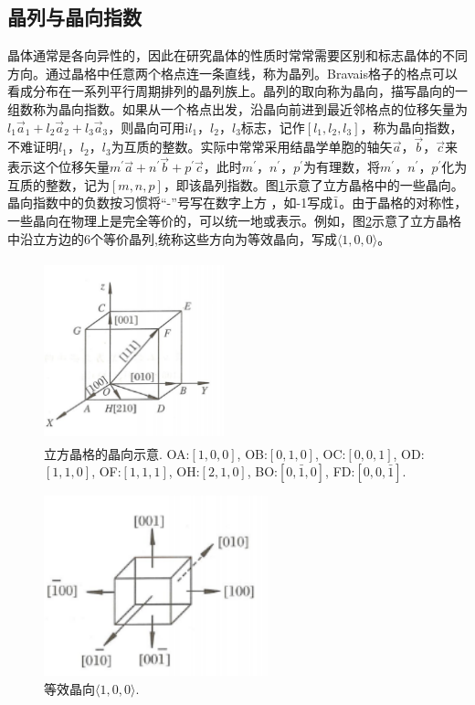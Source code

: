 \subsection{晶列与晶向指数} 
晶体通常是各向异性的，因此在研究晶体的性质时常常需要区别和标志晶体的不同方向。通过晶格中任意两个格点连一条直线，称为晶列。Bravais格子的格点可以看成分布在一系列平行周期排列的晶列族上。晶列的取向称为晶向，描写晶向的一组数称为晶向指数。如果从一个格点出发，沿晶向前进到最近邻格点的位移矢量为$l_1\vec a_1+l_2\vec a_2+l_3\vec a_3$，则晶向可用i$l_1$，$l_2$，$l_3$标志，记作$[l_1,l_2,l_3]$，称为晶向指数，不难证明$l_1$，$l_2$，$l_3$为互质的整数。实际中常常采用结晶学单胞的轴矢$\vec a$，$\vec b$，$\vec c$来表示这个位移矢量$m^{\prime}\vec a+n^{\prime}\vec b+p^{\prime}\vec c$，此时$m^{\prime}$，$n^{\prime}$，$p^{\prime}$为有理数，将$m^{\prime}$，$n^{\prime}$，$p^{\prime}$化为互质的整数，记为$[m,n,p]$，即该晶列指数。图\ref{Fig:Crystal_orientation}示意了立方晶格中的一些晶向。晶向指数中的负数按习惯将``-''号写在数字上方 ，如-1写成$\bar{1}$。由于晶格的对称性，一些晶向在物理上是完全等价的，可以统一地或表示。例如，图\ref{Fig:Cubic_orientation}示意了立方晶格中沿立方边的6个等价晶列,统称这些方向为等效晶向，写成$\langle1,0,0\rangle$。
\begin{figure}[h!]
\centering
\vspace*{-0.05in}
\includegraphics[height=2.05in,width=2.05in,viewport=0 0 45 45,clip]{Figures/Crystal_orientation.png}
\caption{\small \textrm{立方晶格的晶向示意. OA:$[1,0,0]$, OB:$[0,1,0]$, OC:$[0,0,1]$, OD:$[1,1,0]$, OF:$[1,1,1]$, OH:$[2,1,0]$, BO:$[0,\bar{1},0]$, FD:$[0,0,\bar{1}]$.}}%
\label{Fig:Crystal_orientation}
\end{figure}

\begin{figure}[h!]
\centering
\vspace*{-0.05in}
\includegraphics[height=2.05in,width=2.55in,viewport=0 0 45 33,clip]{Figures/Cubic_equal-orientation.png}
\caption{\small \textrm{等效晶向$\langle1,0,0\rangle$.}}%
\label{Fig:Cubic_orientation}
\end{figure}

